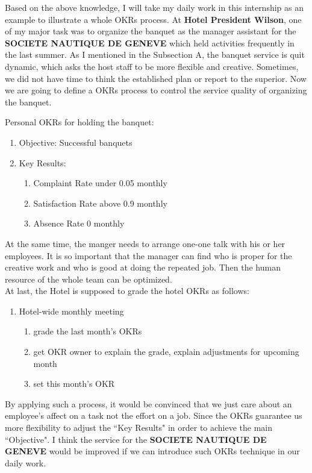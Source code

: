 \documentclass[12pt,onecolumn,a4paper]{IEEEtran}
\begin{document}
Based on the above knowledge, I will take my daily work in this internship as an example to illustrate a whole OKRs process. At \textbf{Hotel President Wilson}, one of my major task was to organize the banquet as the manager assistant for the \textbf{SOCIETE NAUTIQUE DE GENEVE} which held activities frequently in the last summer. As I mentioned in the Subsection A, the banquet service is quit dynamic, which asks the host staff to be more flexible and creative. Sometimes, we did not have time to think the established plan or report to the superior. Now we are going to define a OKRs process to control the service quality of organizing the banquet.

\newpage

Personal OKRs for holding the banquet:

\begin{enumerate}
  \item Objective: Successful banquets
  \item Key Results:
  \begin{enumerate}
    \item Complaint Rate under 0.05 monthly
    \item Satisfaction Rate above 0.9 monthly
    \item Absence Rate 0 monthly
  \end{enumerate}
\end{enumerate}

At the same time, the manger needs to arrange one-one talk with his or her employees. It is so important that the manager can find who is proper for the creative work and who is good at doing the repeated job. Then the human resource of the whole team can be optimized.\\ 

At last, the Hotel is supposed to grade the hotel OKRs as follows:
\begin{enumerate}
  \item Hotel-wide monthly meeting\cite{OKRGV}
  \begin{enumerate}
    \item grade the last month's OKRs
    \item get OKR owner to explain the grade, explain adjustments for upcoming month
    \item set this month's OKR
  \end{enumerate}
\end{enumerate}

By applying such a process, it would be convinced that we just care about an employee's affect on a task not the effort on a job. Since the OKRs guarantee us more flexibility to adjust the ``Key Results" in order to achieve the main ``Objective". I think the service for the \textbf{SOCIETE NAUTIQUE DE GENEVE} would be improved if we can introduce such OKRs technique in our daily work.
\end{document}

